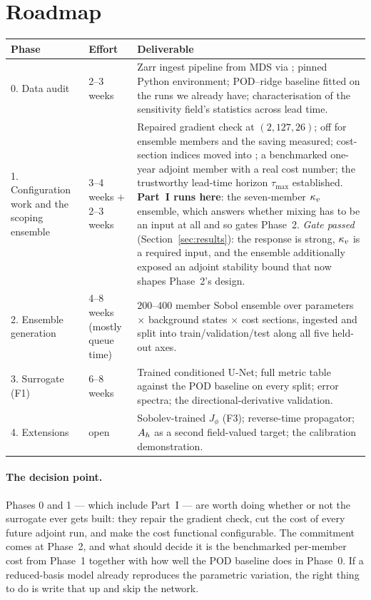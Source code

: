 \section{Roadmap}

\begin{center}
\begin{tabularx}{\textwidth}{@{}Y{0.6}Y{0.55}Y{1.85}@{}}
\toprule
\textbf{Phase} & \textbf{Effort} & \textbf{Deliverable}\\
. Data audit
  & 2--3 weeks
  & Zarr ingest pipeline from MDS via ; pinned Python
    environment; POD--ridge baseline fitted on the runs we already have;
    characterisation of the sensitivity field's statistics across lead time.\\
1. Configuration work
    and the scoping ensemble
  & 3--4 weeks
    $+$ 2--3 weeks
  & Repaired gradient check at $(2,127,26)$;  off for ensemble
    members and the saving measured; cost-section indices moved into
    ; a benchmarked one-year adjoint member with a real cost
    number; the trustworthy lead-time horizon $\tau_{\max}$ established.
    \textbf{Part~I runs here}: the seven-member $\kappa_{v}$ ensemble, which answers
    whether mixing has to be an input at all and so gates Phase~2.
    \emph{Gate passed} (Section~\ref{sec:results}): the response is strong,
    $\kappa_{v}$ is a required input, and the ensemble additionally exposed an
    adjoint stability bound that now shapes Phase~2's design.\\
2. Ensemble generation
  & 4--8 weeks (mostly queue time)
  & $200$--$400$ member Sobol ensemble over parameters $\times$ background
    states $\times$ cost sections, ingested and split into
    train/validation/test along all five held-out axes.\\
3. Surrogate (F1)
  & 6--8 weeks
  & Trained conditioned U-Net; full metric table against the POD baseline on
    every split; error spectra; the directional-derivative validation.\\
4. Extensions
  & open
  & Sobolev-trained $J_\phi$ (F3); reverse-time propagator; $A_{h}$ as a second
    field-valued target; the calibration demonstration.\\
\bottomrule
\end{tabularx}
\end{center}

\paragraph{The decision point.}
Phases 0 and 1 --- which include Part~I --- are worth doing whether or not the
surrogate ever gets built:
they repair the gradient check, cut the cost of every future adjoint run, and
make the cost functional configurable. The commitment comes at Phase~2, and
what should decide it is the benchmarked per-member cost from Phase~1 together
with how well the POD baseline does in Phase~0. If a reduced-basis model
already reproduces the parametric variation, the right thing to do is write
that up and skip the network.

